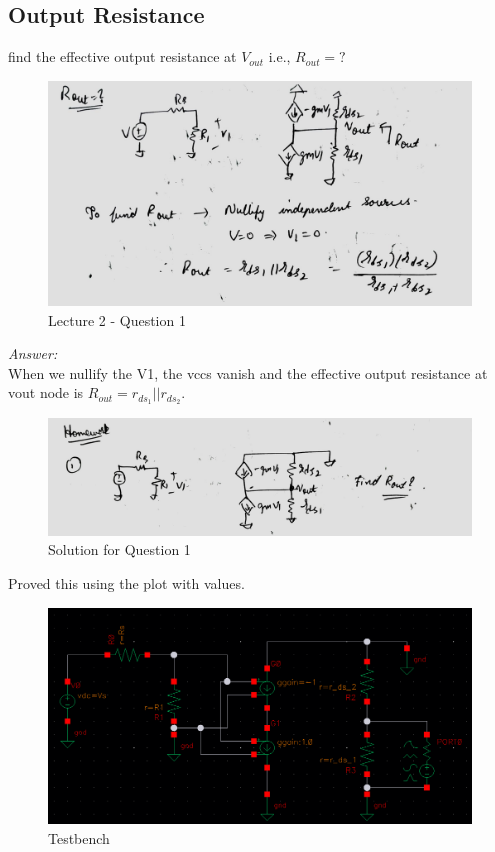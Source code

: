 \documentclass[a4paper]{article}
\begin{document}
\subsection{Output Resistance}
find the effective output resistance at $V_{out}$ i.e., $R_{out} = ?$ \\
\begin{figure}
    \centering
    \includegraphics[width=0.8\linewidth]{images/Lec_2_Q1.jpeg}
    \caption{Lecture 2 - Question 1}
\end{figure}
\textit{Answer:}\\
When we nullify the V1, the vccs vanish and the effective output resistance at vout node is $R_{out} = r_{ds_1} || r_{ds_2}$. 
\begin{figure}
    \centering
    \includegraphics[width=1\linewidth]{images/Lec_2_Q_1_Soln.jpeg}
    \caption{Solution for Question 1}
\end{figure}
Proved this using the plot with values.

\begin{figure}
    \centering
    \includegraphics[width=1\linewidth]{images/Lec_2_Q_1_testbench.png}
    \caption{Testbench}
\end{figure}
\end{document}
